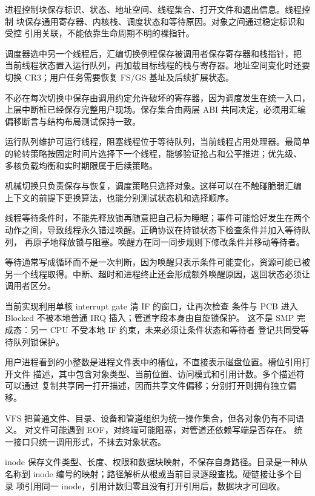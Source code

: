 进程控制块保存标识、状态、地址空间、线程集合、打开文件和退出信息。线程控制
块保存通用寄存器、内核栈、调度状态和等待原因。对象之间通过稳定标识和受控
引用关联，不能依靠生命周期不明的裸指针。

调度器选中另一个线程后，汇编切换例程保存被调用者保存寄存器和栈指针，把
当前线程状态置入运行队列，再加载目标线程的栈与寄存器。地址空间变化时还要
切换 CR3；用户任务需要恢复 FS/GS 基址及后续扩展状态。

不必在每次切换中保存由调用约定允许破坏的寄存器，因为调度发生在统一入口，
上层中断桩已经保存完整用户现场。保存集合由两层 ABI 共同决定，必须用汇编
偏移断言与结构布局测试保持一致。

运行队列维护可运行线程，阻塞线程位于等待队列，当前线程占用处理器。最简单
的轮转策略按固定时间片选择下一个线程，能够验证抢占和公平推进；优先级、
多核负载均衡和实时期限属于后续策略。

机械切换只负责保存与恢复，调度策略只选择对象。这样可以在不触碰脆弱汇编
上下文的前提下更换算法，也能分别测试状态机和选择顺序。

线程等待条件时，不能先释放锁再随意把自己标为睡眠；事件可能恰好发生在两个
动作之间，导致线程永久错过唤醒。正确协议在持锁状态下检查条件并加入等待队列，
再原子地释放锁与阻塞。唤醒方在同一同步规则下修改条件并移动等待者。

等待通常写成循环而不是一次判断，因为唤醒只表示条件可能变化，资源可能已被
另一个线程取得。中断、超时和进程终止还会形成额外唤醒原因，返回状态必须让
调用者区分。

当前实现利用单核  interrupt gate 清 IF 的窗口，让再次检查
条件与 PCB 进入 Blocked 不被本地普通 IRQ 插入；管道字段本身由自旋锁保护。
这不是 SMP 完成态：另一 CPU 不受本地 IF 约束，未来必须让条件状态和等待者
登记共同受等待队列锁保护。

用户进程看到的小整数是进程文件表中的槽位，不直接表示磁盘位置。槽位引用打开文件
描述，其中包含对象类型、当前位置、访问模式和引用计数。多个描述符可以通过
复制共享同一打开描述，因而共享文件偏移；分别打开则拥有独立偏移。

VFS 把普通文件、目录、设备和管道组织为统一操作集合，但各对象仍有不同语义。
 对文件可能遇到 EOF，对终端可能阻塞，对管道还依赖写端是否存在。
统一接口只统一调用形式，不抹去对象状态。

inode 保存文件类型、长度、权限和数据块映射，不保存自身路径。目录是一种从
名称到 inode 编号的映射；路径解析从根或当前目录逐段查找。硬链接让多个目录
项引用同一 inode，引用计数归零且没有打开引用后，数据块才可回收。


